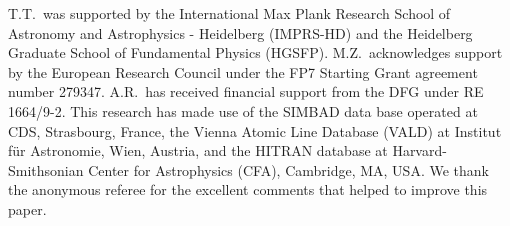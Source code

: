 \documentclass{aa}
\begin{document}
\begin{acknowledgements}
      T.T.\ was supported by the International Max Plank Research School of Astronomy and Astrophysics - Heidelberg (IMPRS-HD)
and the Heidelberg Graduate School of Fundamental Physics (HGSFP). M.Z.\ acknowledges support by the European Research Council under the FP7 
Starting Grant agreement number 279347. A.R.\ has received financial support from the DFG under RE 
1664/9-2. This research has made use of the SIMBAD data base operated
at CDS, Strasbourg, France, the Vienna Atomic Line Database (VALD) at Institut f\"{u}r Astronomie, Wien, Austria, and
the HITRAN database at Harvard-Smithsonian Center for Astrophysics (CFA), Cambridge, MA, USA.
We thank the anonymous referee for the excellent comments that helped to improve this paper.



\end{acknowledgements}





 
  


\end{document}
